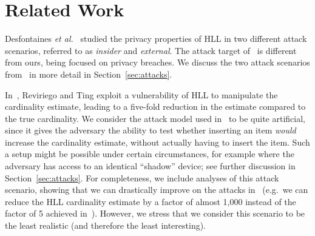 \documentclass[sigconf, anonymous, dvipsnames]{acmart} %
\begin{document}
\section{Related Work}\label{sec:related}

Desfontaines \emph{et al.}~\cite{cardestprivacy} studied the privacy properties of HLL in two different attack scenarios, referred to as \emph{insider} and \emph{external}. The attack target of~\cite{cardestprivacy} is different from ours, being focused on privacy breaches. %
We discuss the two attack scenarios from~\cite{cardestprivacy} in more detail in Section~\ref{sec:attacks}. 


In~\cite{hllvuln}, Reviriego and Ting exploit a vulnerability of HLL to manipulate the cardinality estimate, leading to a five-fold reduction in the estimate compared to the true cardinality. We consider the attack model used in~\cite{hllvuln} to be quite artificial, since it gives the adversary the ability to test whether inserting an item \emph{would} increase the cardinality estimate, without actually having to insert the item. Such a setup might be possible under certain circumstances, for example where the adversary has access to an identical ``shadow'' device; see further discussion in Section~\ref{sec:attacks}. For completeness, we include analyses of this attack scenario, showing that we can drastically improve on the attacks in~\cite{hllvuln} (e.g.\ we can reduce the HLL cardinality estimate by a factor of almost 1,000 instead of the factor of 5 achieved in~\cite{hllvuln}). However, we stress that we consider this scenario to be the least realistic (and therefore the least interesting).
\end{document}
